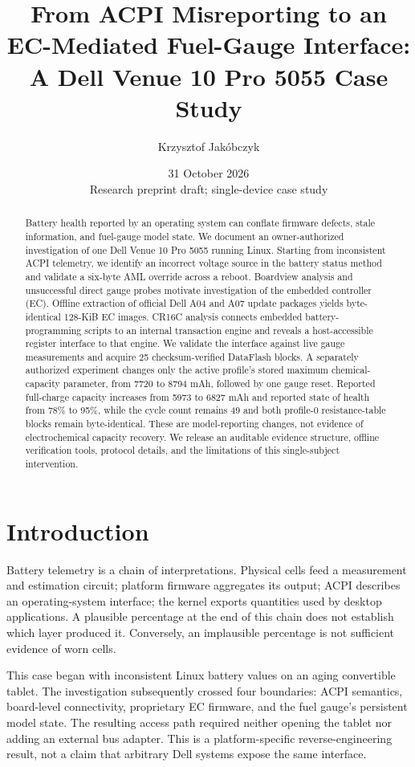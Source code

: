 \documentclass[11pt,a4paper]{article}
\title{From ACPI Misreporting to an EC-Mediated Fuel-Gauge Interface:\\A Dell Venue 10 Pro 5055 Case Study}
\author{Krzysztof Jakóbczyk}
\date{31 October 2026\\\small Research preprint draft; single-device case study}
\begin{document}
\maketitle
\begin{abstract}
Battery health reported by an operating system can conflate firmware defects, stale information, and fuel-gauge model state. We document an owner-authorized investigation of one Dell Venue 10 Pro 5055 running Linux. Starting from inconsistent ACPI telemetry, we identify an incorrect voltage source in the battery status method and validate a six-byte AML override across a reboot. Boardview analysis and unsuccessful direct gauge probes motivate investigation of the embedded controller (EC). Offline extraction of official Dell A04 and A07 update packages yields byte-identical 128-KiB EC images. CR16C analysis connects embedded battery-programming scripts to an internal transaction engine and reveals a host-accessible register interface to that engine. We validate the interface against live gauge measurements and acquire 25 checksum-verified DataFlash blocks. A separately authorized experiment changes only the active profile's stored maximum chemical-capacity parameter, from 7720 to 8794 mAh, followed by one gauge reset. Reported full-charge capacity increases from 5973 to 6827 mAh and reported state of health from 78\% to 95\%, while the cycle count remains 49 and both profile-0 resistance-table blocks remain byte-identical. These are model-reporting changes, not evidence of electrochemical capacity recovery. We release an auditable evidence structure, offline verification tools, protocol details, and the limitations of this single-subject intervention.
\end{abstract}

\section{Introduction}
Battery telemetry is a chain of interpretations. Physical cells feed a measurement and estimation circuit; platform firmware aggregates its output; ACPI describes an operating-system interface; the kernel exports quantities used by desktop applications. A plausible percentage at the end of this chain does not establish which layer produced it. Conversely, an implausible percentage is not sufficient evidence of worn cells.

This case began with inconsistent Linux battery values on an aging convertible tablet. The investigation subsequently crossed four boundaries: ACPI semantics, board-level connectivity, proprietary EC firmware, and the fuel gauge's persistent model state. The resulting access path required neither opening the tablet nor adding an external bus adapter. This is a platform-specific reverse-engineering result, not a claim that arbitrary Dell systems expose the same interface.
\end{document}
